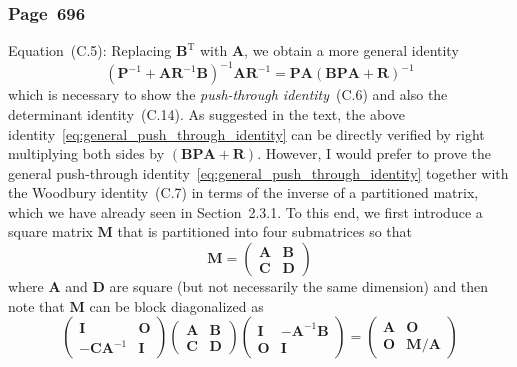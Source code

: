\documentclass[12pt,a4paper]{article}
\newcommand{\erratum}[1]{\subsubsection*{#1}}
\begin{document}
\erratum{Page~696}
Equation~(C.5):
Replacing $\mathbf{B}^{\operatorname{T}}$ with $\mathbf{A}$, we obtain a more general identity
\begin{equation}
\left( \mathbf{P}^{-1} + \mathbf{A}\mathbf{R}^{-1}\mathbf{B} \right)^{-1}
\mathbf{A}\mathbf{R}^{-1}
=
\mathbf{P}\mathbf{A}
\left( \mathbf{B}\mathbf{P}\mathbf{A} + \mathbf{R} \right)^{-1}
\label{eq:general_push_through_identity}
\end{equation}
which is necessary to show the \emph{push-through identity}~(C.6) and also
the determinant identity~(C.14).
As suggested in the text,
the above identity~\eqref{eq:general_push_through_identity} can be
directly verified by right multiplying both sides by
$\left( \mathbf{B}\mathbf{P}\mathbf{A} + \mathbf{R} \right)$.
However, I would prefer to prove
the general push-through identity~\eqref{eq:general_push_through_identity}
together with the Woodbury identity~(C.7) in terms of the inverse of a partitioned matrix,
which we have already seen in Section~2.3.1.
To this end, we first introduce a square matrix $\mathbf{M}$ that is partitioned into
four submatrices so that
\begin{equation}
\mathbf{M} =
\begin{pmatrix}
\mathbf{A} & \mathbf{B} \\
\mathbf{C} & \mathbf{D}
\end{pmatrix}
\end{equation}
where $\mathbf{A}$ and $\mathbf{D}$ are square (but not necessarily the same dimension)
and then note that $\mathbf{M}$ can be block diagonalized as
\begin{equation}
\begin{pmatrix}
\mathbf{I} & \mathbf{O} \\
-\mathbf{C}\mathbf{A}^{-1} & \mathbf{I}
\end{pmatrix}
\begin{pmatrix}
\mathbf{A} & \mathbf{B} \\
\mathbf{C} & \mathbf{D}
\end{pmatrix}
\begin{pmatrix}
\mathbf{I} & -\mathbf{A}^{-1}\mathbf{B} \\
\mathbf{O} & \mathbf{I}
\end{pmatrix}
=
\begin{pmatrix}
\mathbf{A} & \mathbf{O} \\
\mathbf{O} & \mathbf{M}/\mathbf{A}
\end{pmatrix}
\label{eq:block_diagonalization_of_partitioned_matrix_with_Schur_complement_wrt_A}
\end{equation}
\end{document}
